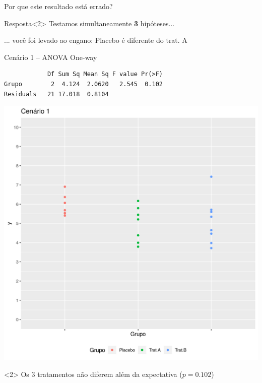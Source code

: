 \documentclass{beamer}
\begin{document}
\begin{frame}
  \begin{center}
    Por que este resultado está errado?
  \end{center}

  \vfill
  \begin{block}{Resposta}<2>
    Testamos simultaneamente {\bf 3} hipóteses...

    \bigskip
    \small
    ... você foi levado ao engano: Placebo é diferente do trat. A
  \end{block}
\end{frame}

\begin{frame}[fragile, label=cenario1-1way]
  \begin{exampleblock}{Cenário 1 -- ANOVA One-way}
    \tiny
\begin{verbatim}
            Df Sum Sq Mean Sq F value Pr(>F)
Grupo        2  4.124  2.0620   2.545  0.102
Residuals   21 17.018  0.8104
\end{verbatim}
    \begin{center}
      \includegraphics[height=.5\textheight]{Cap13-30/cenario1}
    \end{center}
  \end{exampleblock}
  \begin{block}{}<2>
    \small
    Os 3 tratamentos não diferem além da expectativa ($p=0.102$)
  \end{block}
\end{frame}
\end{document}
